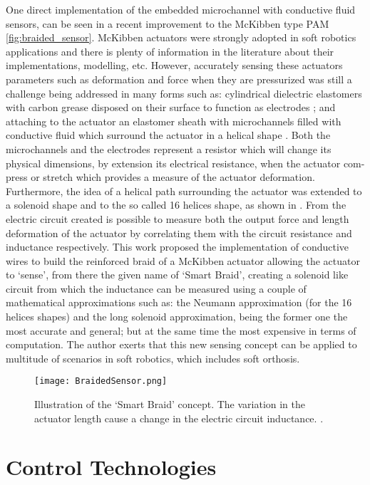 One direct implementation of the embedded microchannel with conductive fluid sensors, can be seen in a recent improvement to the McKibben type PAM \autoref{fig:braided_sensor}. McKibben actuators were strongly adopted in soft robotics applications and there is plenty of information in the literature about their implementations, modelling, etc. However, accurately sensing these actuators parameters such as deformation and force when they are pressurized was still a challenge being addressed in many forms such as: cylindrical dielectric elastomers with carbon grease disposed on their surface to function as electrodes \cite{Goulbourne2007}; and attaching to the actuator an elastomer sheath with microchannels filled with conductive fluid which surround the actuator in a helical shape \cite{Park2013}. Both the microchannels and the electrodes represent a resistor which will change its physical dimensions, by extension its electrical resistance, when the actuator com-press or stretch which provides a measure of the actuator deformation. Furthermore, the idea of a helical path surrounding the actuator was extended to a solenoid shape and to the so called 16 helices shape, as shown in \cite{Felt2014,Felt2015}. From the electric circuit created is possible to measure both the output force and length deformation of the actuator by correlating them with the circuit resistance and inductance respectively. This work proposed the implementation of conductive wires to build the reinforced braid of a McKibben actuator allowing the actuator to `sense', from there the given name of `Smart Braid', creating a solenoid like circuit from which the inductance can be measured using a couple of mathematical approximations such as: the Neumann approximation (for the 16 helices shapes) and the long solenoid approximation, being the former one the most accurate and general; but at the same time the most expensive in terms of computation. The author exerts that this new sensing concept can be applied to multitude of scenarios in soft robotics, which includes soft orthosis.

\begin{figure}[hbtp!]
    \centering
    \texttt{[image: BraidedSensor.png]}
    \caption{Illustration of the `Smart Braid' concept. The variation in the actuator length cause a change in the electric circuit inductance. \cite{Felt2015}. }
    \label{fig:braided_sensor}
\end{figure}

\section{Control Technologies} \label{sec:controlSystems}

